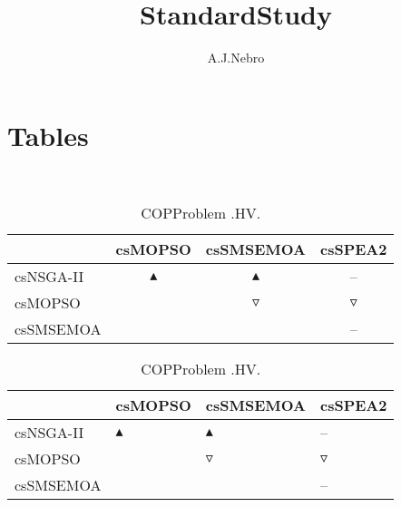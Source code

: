 \documentclass{article}
\title{StandardStudy}
\author{A.J.Nebro}
\begin{document}
\maketitle
\section{Tables}
\
\begin{table}
\caption{
COPProblem
.HV.}
\label{Table:
COPProblem
.HV.}
\centering
\begin{scriptsize}
\begin{tabular}{
lccc
}
\hline  & csMOPSO & csSMSEMOA & csSPEA2\\ 
\hline 
csNSGA-II
 & 
$\blacktriangle$
 & 
$\blacktriangle$
 & 
--
 \\ 
csMOPSO
 & 
  
 & 
$\triangledown$
 & 
$\triangledown$
 \\ 
csSMSEMOA
 & 
 
 & 
  
 & 
--
 \\ 
\hline
\end{tabular}
\end{scriptsize}
\end{table}
\begin{table}
\caption{
COPProblem 
.HV.}
\label{Table:
COPProblem 
.HV.}
\centering
\begin{scriptsize}
\begin{tabular}{
| l | p{0.15cm}   | p{0.15cm}   | p{0.15cm}   | 
}
\hline \multicolumn{1}{|c|}{} & \multicolumn{1}{c|}{csMOPSO} & \multicolumn{1}{c|}{csSMSEMOA} & \multicolumn{1}{c|}{csSPEA2} \\
\hline 
csNSGA-II
 & 
$\blacktriangle$
 & 
$\blacktriangle$
 & 
--
 \\ 
csMOPSO
 & 
  
 & 
$\triangledown$
 & 
$\triangledown$
 \\ 
csSMSEMOA
 & 
 
 & 
  
 & 
--
 \\ 
\hline
\end{tabular}
\end{scriptsize}
\end{table}
\end{document}
